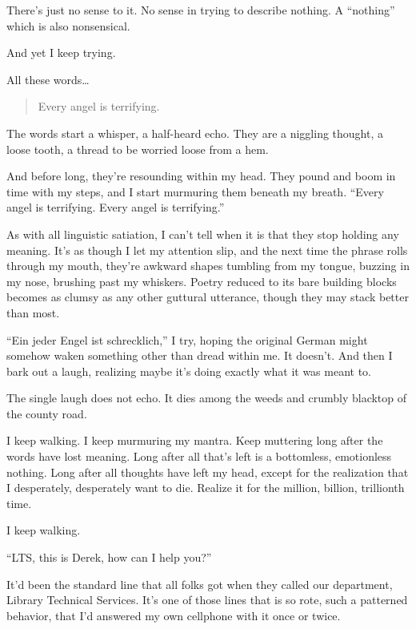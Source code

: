 There's just no sense to it. No sense in trying to describe nothing. A ``nothing'' which is also nonsensical.

And yet I keep trying.

All these words\ldots{}

\secdiv{}

\noindent \begin{verse}
Every angel is terrifying.
\end{verse}

The words start a whisper, a half-heard echo. They are a niggling thought, a loose tooth, a thread to be worried loose from a hem.

And before long, they're resounding within my head. They pound and boom in time with my steps, and I start murmuring them beneath my breath. ``Every angel is terrifying. Every angel is terrifying.''

As with all linguistic satiation, I can't tell when it is that they stop holding any meaning. It's as though I let my attention slip, and the next time the phrase rolls through my mouth, they're awkward shapes tumbling from my tongue, buzzing in my nose, brushing past my whiskers. Poetry reduced to its bare building blocks becomes as clumsy as any other guttural utterance, though they may stack better than most.

``Ein jeder Engel ist schrecklich,'' I try, hoping the original German might somehow waken something other than dread within me. It doesn't. And then I bark out a laugh, realizing maybe it's doing exactly what it was meant to.

The single laugh does not echo. It dies among the weeds and crumbly blacktop of the county road.

I keep walking. I keep murmuring my mantra. Keep muttering long after the words have lost meaning. Long after all that's left is a bottomless, emotionless nothing. Long after all thoughts have left my head, except for the realization that I desperately, desperately want to die. Realize it for the million, billion, trillionth time.

I keep walking.

\secdiv{}

\noindent ``LTS, this is Derek, how can I help you?''

It'd been the standard line that all folks got when they called our department, Library Technical Services. It's one of those lines that is so rote, such a patterned behavior, that I'd answered my own cellphone with it once or twice.

